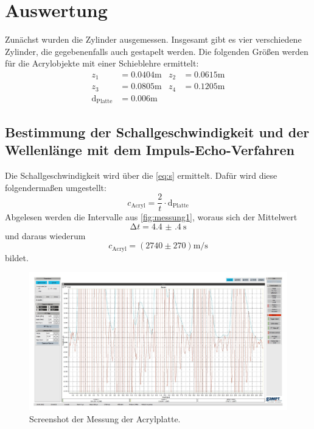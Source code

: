 \section{Auswertung}
\label{sec:Auswertung}

Zunächst wurden die Zylinder ausgemessen. Insgesamt gibt es vier verschiedene Zylinder, die gegebenenfalls auch gestapelt werden.
Die folgenden Größen werden für die Acrylobjekte mit einer Schieblehre ermittelt:
\begin{align*}
  z_1 &= 0.0404 \unit\meter & z_2 &= 0.0615 \unit\meter \\
  z_3 &= 0.0805 \unit\meter & z_4 &= 0.1205 \unit\meter \\
  \text{d}_\text{Platte} &= 0.006 \unit\meter
\end{align*}

\subsection{Bestimmung der Schallgeschwindigkeit und der Wellenlänge mit dem Impuls-Echo-Verfahren}

Die Schallgeschwindigkeit wird über die \autoref{eq:s} ermittelt.
Dafür wird diese folgendermaßen umgestellt:
\begin{equation}\label{eq:c_schall}
  c_\text{Acryl} = \frac{2}{t} \cdot \text{d}_\text{Platte}
\end{equation}
Abgelesen werden die Intervalle aus \autoref{fig:messung1}, woraus sich der Mittelwert
\begin{equation}
  \increment t = \qty{4.4(4)}{\second}
\end{equation}
und daraus wiederum
\begin{equation}
  c_\text{Acryl} = (2740 \pm 270) \unit{\meter\per\second}
\end{equation}
bildet. 

\begin{figure} [H]
  \centering
  \includegraphics[width =\linewidth]{pictures/Schallgeschwindigkeit/Messung1.pdf}
  \caption{Screenshot der Messung der Acrylplatte.}
  \label{fig:messung1}
\end{figure}

